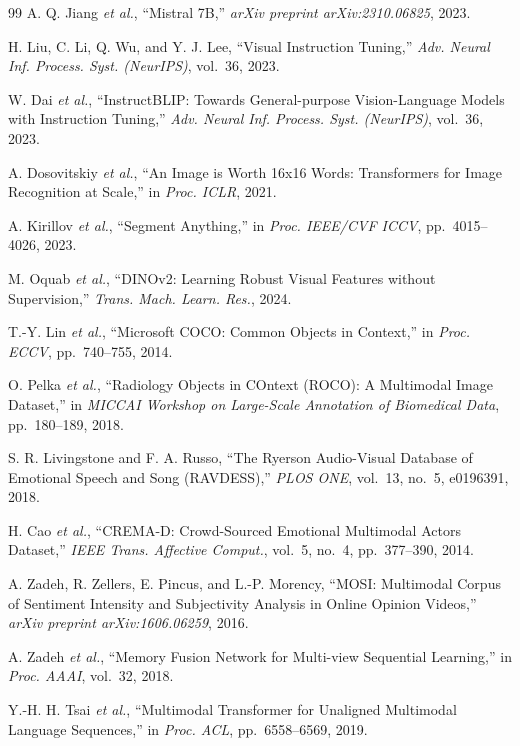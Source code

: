 \documentclass[10pt,conference]{IEEEtran}
\theoremstyle{ieeethm}
\theoremstyle{ieeedef}
\theoremstyle{ieeeremark}
\begin{document}
\begin{thebibliography}{99}
A. Q. Jiang \textit{et al.},
``Mistral 7B,''
\textit{arXiv preprint arXiv:2310.06825}, 2023.

H. Liu, C. Li, Q. Wu, and Y. J. Lee,
``Visual Instruction Tuning,''
\textit{Adv. Neural Inf. Process. Syst. (NeurIPS)}, vol.~36, 2023.

W. Dai \textit{et al.},
``InstructBLIP: Towards General-purpose Vision-Language Models with Instruction Tuning,''
\textit{Adv. Neural Inf. Process. Syst. (NeurIPS)}, vol.~36, 2023.

A. Dosovitskiy \textit{et al.},
``An Image is Worth 16x16 Words: Transformers for Image Recognition at Scale,''
in \textit{Proc. ICLR}, 2021.

A. Kirillov \textit{et al.},
``Segment Anything,''
in \textit{Proc. IEEE/CVF ICCV}, pp.~4015--4026, 2023.

M. Oquab \textit{et al.},
``DINOv2: Learning Robust Visual Features without Supervision,''
\textit{Trans. Mach. Learn. Res.}, 2024.

T.-Y. Lin \textit{et al.},
``Microsoft COCO: Common Objects in Context,''
in \textit{Proc. ECCV}, pp.~740--755, 2014.

O. Pelka \textit{et al.},
``Radiology Objects in COntext (ROCO): A Multimodal Image Dataset,''
in \textit{MICCAI Workshop on Large-Scale Annotation of Biomedical Data}, pp.~180--189, 2018.

S. R. Livingstone and F. A. Russo,
``The Ryerson Audio-Visual Database of Emotional Speech and Song (RAVDESS),''
\textit{PLOS ONE}, vol.~13, no.~5, e0196391, 2018.

H. Cao \textit{et al.},
``CREMA-D: Crowd-Sourced Emotional Multimodal Actors Dataset,''
\textit{IEEE Trans. Affective Comput.}, vol.~5, no.~4, pp.~377--390, 2014.

A. Zadeh, R. Zellers, E. Pincus, and L.-P. Morency,
``MOSI: Multimodal Corpus of Sentiment Intensity and Subjectivity Analysis in Online Opinion Videos,''
\textit{arXiv preprint arXiv:1606.06259}, 2016.

A. Zadeh \textit{et al.},
``Memory Fusion Network for Multi-view Sequential Learning,''
in \textit{Proc. AAAI}, vol.~32, 2018.

Y.-H. H. Tsai \textit{et al.},
``Multimodal Transformer for Unaligned Multimodal Language Sequences,''
in \textit{Proc. ACL}, pp.~6558--6569, 2019.


\end{thebibliography}
\end{document}
